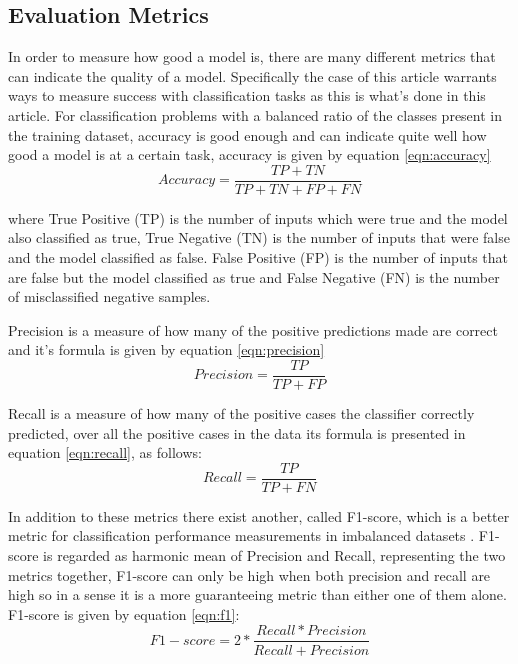 \documentclass[a4paper]{article}
\begin{document}
\subsection{Evaluation Metrics}
In order to measure how good a model is, there are many
different metrics that can indicate the quality of a model. Specifically the case of this article warrants ways to measure success with classification tasks as this is what's done in this article. For
classification problems with a balanced ratio of the classes
present in the training dataset, accuracy is good enough and
can indicate quite well how good a model is at a certain task, accuracy is given by equation \ref{eqn:accuracy}
\begin{equation}
    Accuracy = \frac{TP + TN}{TP + TN + FP + FN}
    \label{eqn:accuracy}
\end{equation}

where True Positive (TP) is the number of inputs which were true and the
model also classified as true, True Negative (TN) is the number
of inputs that were false and the model classified as false.
False Positive (FP) is the number of inputs that are false but
the model classified as true and False Negative (FN) is the number of misclassified negative samples.

Precision is a measure of how many of the positive predictions made are correct and it's formula is given by equation \ref{eqn:precision}
\begin{equation}
    Precision = \frac{TP}{TP + FP}
    \label{eqn:precision}
\end{equation}

Recall is a measure of how many of
the positive cases the classifier correctly predicted, over all
the positive cases in the data
its formula is presented in
equation \ref{eqn:recall}, as follows:
\begin{equation}
    Recall = \frac{TP}{TP + FN}
    \label{eqn:recall}
\end{equation}

In addition to these metrics there exist another, called F1-score, which is a better metric for classification performance measurements in imbalanced datasets \cite{f1_imbalance} . F1-score is regarded as harmonic mean of Precision and Recall, representing the two metrics together, F1-score can only be high when both precision and recall are high so in a sense it is a more guaranteeing metric than either one of them alone. F1-score is given by equation \ref{eqn:f1}:
\begin{equation}
    F1-score = 2*\frac{Recall * Precision}{Recall + Precision}
    \label{eqn:f1}
\end{equation}
\end{document}
